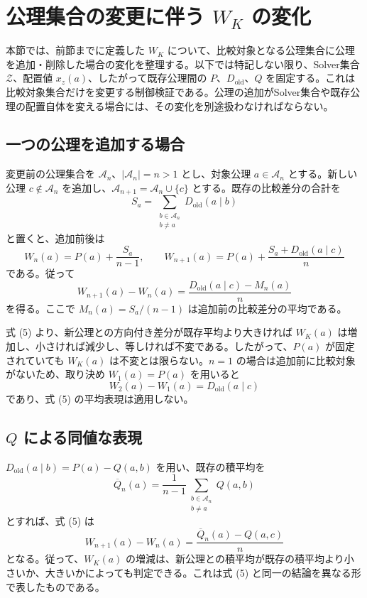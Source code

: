\section{公理集合の変更に伴う $W_K$ の変化}
\label{sec:WK-set-change}

本節では、前節までに定義した $W_K$ について、比較対象となる公理集合に公理を追加・削除した場合の変化を整理する。以下では特記しない限り、Solver集合 $\mathcal{Z}$、配置値 $x_z(a)$、したがって既存公理間の $P$、$D_{\mathrm{old}}$、$Q$ を固定する。これは比較対象集合だけを変更する制御検証である。公理の追加がSolver集合や既存公理の配置自体を変える場合には、その変化を別途扱わなければならない。

\subsection{一つの公理を追加する場合}

変更前の公理集合を $\mathcal{A}_n$、$|\mathcal{A}_n|=n>1$ とし、対象公理 $a\in\mathcal{A}_n$ とする。新しい公理 $c\notin\mathcal{A}_n$ を追加し、$\mathcal{A}_{n+1}=\mathcal{A}_n\cup\{c\}$ とする。既存の比較差分の合計を
\[
S_a=\sum_{\substack{b\in\mathcal{A}_n\\b\ne a}}D_{\mathrm{old}}(a\mid b)
\]
と置くと、追加前後は
\[
W_n(a)=P(a)+\frac{S_a}{n-1},\qquad
W_{n+1}(a)=P(a)+\frac{S_a+D_{\mathrm{old}}(a\mid c)}{n}
\]
である。従って
\[
\boxed{
W_{n+1}(a)-W_n(a)
=\frac{D_{\mathrm{old}}(a\mid c)-M_n(a)}{n}
}
\tag{5}
\]
を得る。ここで $M_n(a)=S_a/(n-1)$ は追加前の比較差分の平均である。

式 (5) より、新公理との方向付き差分が既存平均より大きければ $W_K(a)$ は増加し、小さければ減少し、等しければ不変である。したがって、$P(a)$ が固定されていても $W_K(a)$ は不変とは限らない。$n=1$ の場合は追加前に比較対象がないため、取り決め $W_1(a)=P(a)$ を用いると
\[
W_2(a)-W_1(a)=D_{\mathrm{old}}(a\mid c)
\]
であり、式 (5) の平均表現は適用しない。

\subsection{$Q$ による同値な表現}

$D_{\mathrm{old}}(a\mid b)=P(a)-Q(a,b)$ を用い、既存の積平均を
\[
\overline Q_n(a)=\frac{1}{n-1}\sum_{\substack{b\in\mathcal{A}_n\\b\ne a}}Q(a,b)
\]
とすれば、式 (5) は
\[
\boxed{
W_{n+1}(a)-W_n(a)
=\frac{\overline Q_n(a)-Q(a,c)}{n}
}
\tag{6}
\]
となる。従って、$W_K(a)$ の増減は、新公理との積平均が既存の積平均より小さいか、大きいかによっても判定できる。これは式 (5) と同一の結論を異なる形で表したものである。

